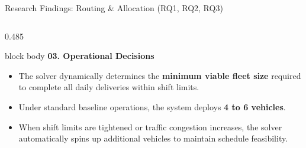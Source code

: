 \documentclass[aspectratio=169,10pt]{beamer}
\begin{document}
\begin{frame}{Research Findings: Routing \& Allocation (RQ1, RQ2, RQ3)}
\begin{columns}[T,totalwidth=\textwidth]
    \begin{column}{0.485\textwidth}
        \begin{beamercolorbox}[rounded=true,shadow=false,wd=\linewidth,sep=4.5pt]{block body}
            {\bfseries\color{Primary}\small 03. Operational Decisions }\par\vspace{0.04cm}
            \footnotesize
            \begin{itemize}
                \setlength{\itemsep}{2pt}
                \scriptsize
                \item The solver dynamically determines the \textbf{minimum viable fleet size} required to complete all daily deliveries within shift limits.
                \item Under standard baseline operations, the system deploys \textbf{4 to 6 vehicles}.
                \item When shift limits are tightened or traffic congestion increases, the solver automatically spins up additional vehicles to maintain schedule feasibility.
            \end{itemize}
        \end{beamercolorbox}

        \vspace{0.15cm}
        \begin{center}
        \end{center}
    \end{column}

\end{columns}

\vfill
\end{frame}

\end{document}
